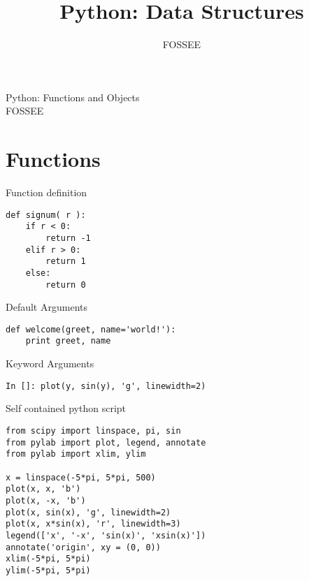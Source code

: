 \documentclass[12pt]{article}
\title{Python: Data Structures}
\author{FOSSEE}
\begin{document}
\date{}
\vspace{-1in}
\begin{center}
\LARGE{Python: Functions and Objects}\\
\large{FOSSEE}
\end{center}
\section{Functions}
Function definition
  \begin{lstlisting}
def signum( r ):    
    if r < 0:
        return -1
    elif r > 0:
        return 1
    else:
        return 0
  \end{lstlisting}
Default Arguments 
\begin{lstlisting}
def welcome(greet, name='world!'):
    print greet, name
\end{lstlisting}
Keyword Arguments
\begin{lstlisting}
In []: plot(y, sin(y), 'g', linewidth=2)
\end{lstlisting}
Self contained python script
  \begin{lstlisting}
from scipy import linspace, pi, sin
from pylab import plot, legend, annotate
from pylab import xlim, ylim

x = linspace(-5*pi, 5*pi, 500)
plot(x, x, 'b')
plot(x, -x, 'b')
plot(x, sin(x), 'g', linewidth=2)
plot(x, x*sin(x), 'r', linewidth=3)
legend(['x', '-x', 'sin(x)', 'xsin(x)'])
annotate('origin', xy = (0, 0))
xlim(-5*pi, 5*pi)
ylim(-5*pi, 5*pi)
  \end{lstlisting}
\end{document}
